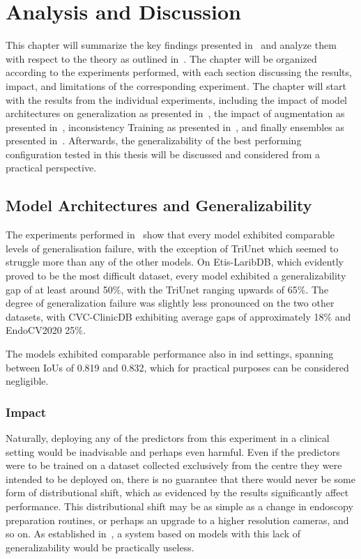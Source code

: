 \chapter{Analysis and Discussion}\label{discussion}
This chapter will summarize the key findings presented in~ and analyze them with respect to the theory as outlined in~. The chapter will be organized according to the experiments performed, with each section discussing the results, impact, and limitations of the corresponding experiment. The chapter will start with the results from the individual experiments, including the impact of model architectures on generalization as presented in~, the impact of augmentation as presented in~, inconsistency Training as presented in~, and finally ensembles as presented in~. Afterwards, the generalizability of the best performing configuration tested in this thesis will be discussed and considered from a practical perspective.

\section{Model Architectures and Generalizability}\label{discussion:models}
The experiments performed in~ show that every model exhibited comparable levels of generalisation failure, with the exception of TriUnet which seemed to struggle more than any of the other models. On Etis-LaribDB, which evidently proved to be the most difficult dataset, every model exhibited a generalizability gap of at least around 50\%, with the TriUnet ranging upwards of 65\%. The degree of generalization failure was slightly less pronounced on the two other datasets, with CVC-ClinicDB exhibiting average gaps of approximately 18\% and EndoCV2020 25\%. 

The models exhibited comparable performance also in \gls{ind} settings, spanning between IoUs of 0.819 and 0.832, which for practical purposes can be considered negligible. 

\subsection{Impact}
Naturally, deploying any of the predictors from this experiment in a clinical setting would be inadvisable and perhaps even harmful. Even if the predictors were to be trained on a dataset collected exclusively from the centre they were intended to be deployed on, there is no guarantee that there would never be some form of distributional shift, which as evidenced by the results significantly affect performance. This distributional shift may be as simple as a change in endoscopy preparation routines, or perhaps an upgrade to a higher resolution cameras, and so on. As established in~, a system based on models with this lack of generalizability would be practically useless. 

